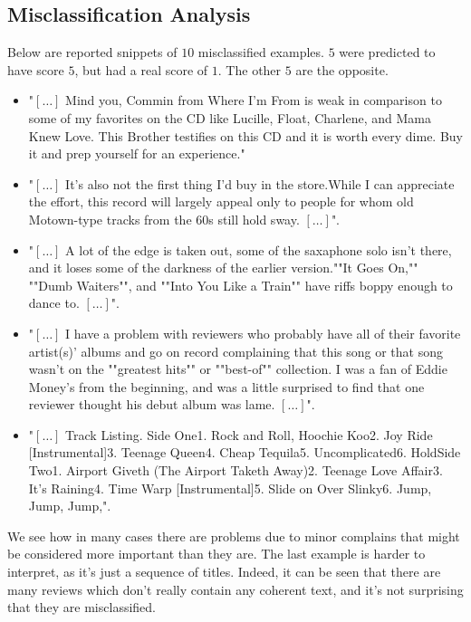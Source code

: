 \documentclass[
12pt,
a4paper,
oneside,
headinclude,
footinclude]{article}
\theoremstyle{definition} %
\begin{document}
\subsection{Misclassification Analysis}
Below are reported snippets of $10$ misclassified examples. $5$ were predicted to have score $5$, but had a real score of $1$. The other $5$ are the opposite.

\begin{itemize}
    \item "$[\ldots]$ Mind you, Commin from Where I'm From is weak in comparison to some of my favorites on the CD like Lucille, Float, Charlene, and Mama Knew Love.  This Brother testifies on this CD and it is worth every dime.  Buy it and prep yourself for an experience."
    \item "$[\ldots]$ It's also not the first thing I'd buy in the store.While I can appreciate the effort, this record will largely appeal only to people for whom old Motown-type tracks from the 60s still hold sway. $[\ldots]$".
    \item "$[\ldots]$ A lot of the edge is taken out, some of the saxaphone solo isn't there, and it loses some of the darkness of the earlier version.""It Goes On,"" ""Dumb Waiters"", and ""Into You Like a Train"" have riffs boppy enough to dance to. $[\ldots]$".
    \item "$[\ldots]$ I have a problem with reviewers who probably have all of their favorite artist(s)' albums and go on record complaining that this song or that song wasn't on the ""greatest hits"" or ""best-of"" collection. I was a fan of Eddie Money's from the beginning, and was a little surprised to find that one reviewer thought his debut album was lame. $[\ldots]$".
    \item "$[\ldots]$ Track Listing. Side One1. Rock and Roll, Hoochie Koo2. Joy Ride [Instrumental]3. Teenage Queen4. Cheap Tequila5. Uncomplicated6. HoldSide Two1. Airport Giveth (The Airport Taketh Away)2. Teenage Love Affair3. It's Raining4. Time Warp [Instrumental]5. Slide on Over Slinky6. Jump, Jump, Jump,".
\end{itemize}

We see how in many cases there are problems due to minor complains that might be considered more important than they are. The last example is harder to interpret, as it's just a sequence of titles. Indeed, it can be seen that there are many reviews which don't really contain any coherent text, and it's not surprising that they are misclassified.
\end{document}

